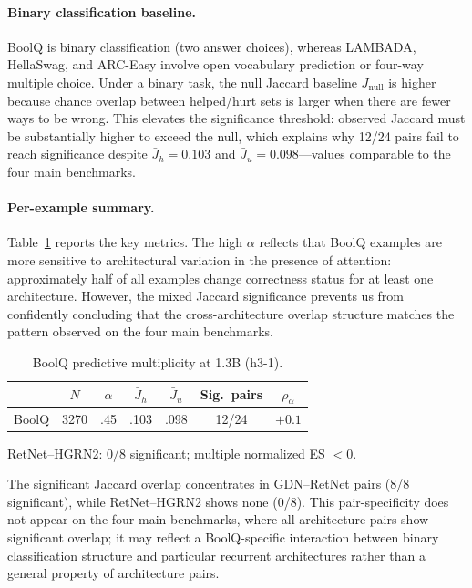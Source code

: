 \paragraph{Binary classification baseline.} BoolQ is binary classification (two answer choices), whereas LAMBADA, HellaSwag, and ARC-Easy involve open vocabulary prediction or four-way multiple choice. Under a binary task, the null Jaccard baseline $J_{\text{null}}$ is higher because chance overlap between helped/hurt sets is larger when there are fewer ways to be wrong. This elevates the significance threshold: observed Jaccard must be substantially higher to exceed the null, which explains why 12/24 pairs fail to reach significance despite $\bar{J}_h = 0.103$ and $\bar{J}_u = 0.098$---values comparable to the four main benchmarks.

\paragraph{Per-example summary.} Table~\ref{tab:boolq_multiplicity} reports the key metrics. The high $\alpha$ reflects that BoolQ examples are more sensitive to architectural variation in the presence of attention: approximately half of all examples change correctness status for at least one architecture. However, the mixed Jaccard significance prevents us from confidently concluding that the cross-architecture overlap structure matches the pattern observed on the four main benchmarks.

\begin{table}[ht]
\centering
\small
\caption{BoolQ predictive multiplicity at 1.3B (h3-1).}
\label{tab:boolq_multiplicity}
\begin{tabular}{@{}lcccccc@{}}
\toprule
 & $N$ & $\alpha$ & $\bar{J}_{h}$ & $\bar{J}_{u}$ & Sig.\ pairs & $\rho_\alpha$ \\
\midrule
BoolQ & 3270 & .45 & .103 & .098 & 12/24 & $+0.1$ \\
\bottomrule
\end{tabular}
\par\vspace{1pt}
{\footnotesize RetNet--HGRN2: 0/8 significant; multiple normalized ES $< 0$.}
\end{table}

The significant Jaccard overlap concentrates in GDN--RetNet pairs (8/8 significant), while RetNet--HGRN2 shows none (0/8). This pair-specificity does not appear on the four main benchmarks, where all architecture pairs show significant overlap; it may reflect a BoolQ-specific interaction between binary classification structure and particular recurrent architectures rather than a general property of architecture pairs.

